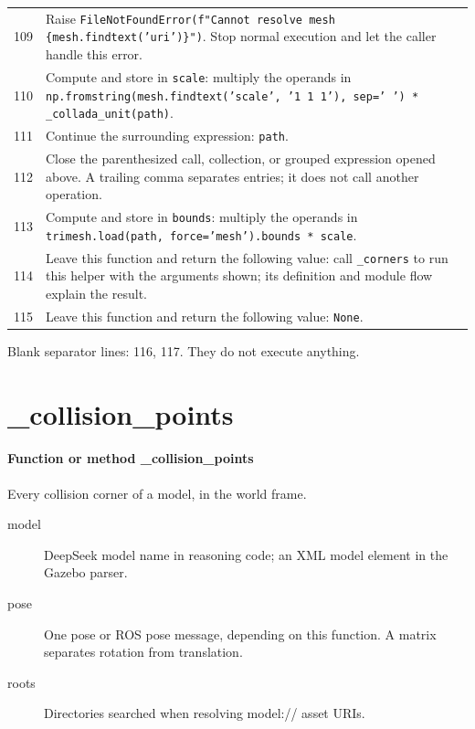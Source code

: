 \documentclass[11pt,a4paper]{book}
\begin{document}
\begin{longtable}{r p{}}
109 & Raise \texttt{FileNotFoundError(f"Cannot resolve mesh \{mesh.findtext('uri')\}")}. Stop normal execution and let the caller handle this error. \\

110 & Compute and store in \texttt{scale}: multiply the operands in \texttt{np.fromstring(mesh.findtext('scale', '1 1 1'), sep=' ') * \_collada\_unit(path)}.  \\

111 & Continue the surrounding expression: \texttt{path}. \\

112 & Close the parenthesized call, collection, or grouped expression opened above. A trailing comma separates entries; it does not call another operation. \\

113 & Compute and store in \texttt{bounds}: multiply the operands in \texttt{trimesh.load(path, force='mesh').bounds * scale}.  \\

114 & Leave this function and return the following value: call \texttt{\_corners} to run this helper with the arguments shown; its definition and module flow explain the result. \\

115 & Leave this function and return the following value: \texttt{None}. \\

\end{longtable}

Blank separator lines: 116, 117. They do not execute anything.

\section{\_collision\_points}

\paragraph{Function or method \_collision\_points}
Every collision corner of a model, in the world frame.

\begin{description}
\item[model] DeepSeek model name in reasoning code; an XML model element in the Gazebo parser.
\item[pose] One pose or ROS pose message, depending on this function. A matrix separates rotation from translation.
\item[roots] Directories searched when resolving model:// asset URIs.
\end{description}
\end{document}
